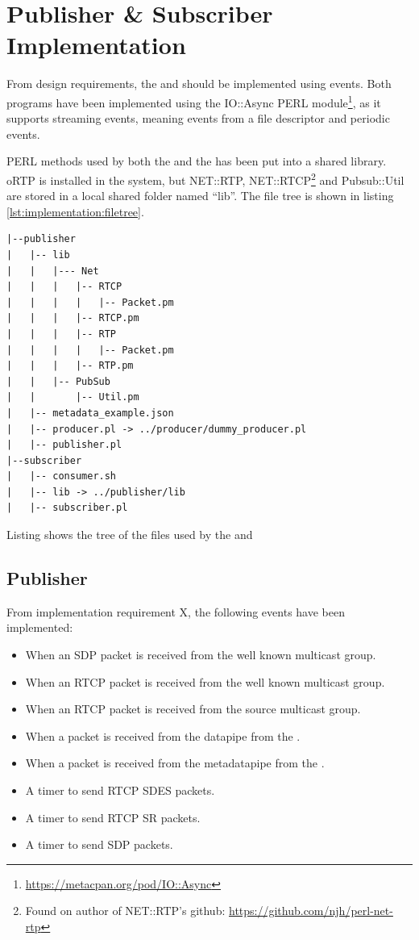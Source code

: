 \section{Publisher \& Subscriber Implementation} \label{sec:implementation:implpubsub}
From design requirements, the \pub{} and \sub{} should be implemented using events. Both programs have been implemented using the IO::Async PERL module\footnote{\url{https://metacpan.org/pod/IO::Async}}, as it supports streaming events, meaning events from a file descriptor and periodic events.

\noindent{}PERL methods used by both the \sub{} and the \pub{} has been put into a shared library. oRTP is installed in the system, but  NET::RTP, NET::RTCP\footnote{Found on author of NET::RTP's github: \url{https://github.com/njh/perl-net-rtp}} and Pubsub::Util are stored in a local shared folder named ``lib''. The file tree is shown in listing \ref{lst:implementation:filetree}.

\begin{listing}[H] 
	\begin{verbatim}
|--publisher
|   |-- lib
|   |   |--- Net
|   |   |   |-- RTCP
|   |   |   |   |-- Packet.pm
|   |   |   |-- RTCP.pm
|   |   |   |-- RTP
|   |   |   |   |-- Packet.pm
|   |   |   |-- RTP.pm
|   |   |-- PubSub
|   |       |-- Util.pm
|   |-- metadata_example.json
|   |-- producer.pl -> ../producer/dummy_producer.pl
|   |-- publisher.pl
|--subscriber
|   |-- consumer.sh
|   |-- lib -> ../publisher/lib
|   |-- subscriber.pl
\end{verbatim}
\caption{Listing shows the tree of the files used by the \sub{} and \pub{}}
\label{lst:implementation:filetree}
\end{listing}

\subsection{Publisher}
From implementation requirement X, the following events have been implemented:
\begin{itemize}
	\item When an SDP packet is received from the well known multicast group.
	\item When an RTCP packet is received from the well known multicast group.
	\item When an RTCP packet is received from the source multicast group.
	\item When a packet is received from the datapipe from the \pro{}.
	\item When a packet is received from the metadatapipe from the \pro{}.
	\item A timer to send RTCP SDES packets.
	\item A timer to send RTCP SR packets.
	\item A timer to send SDP packets.
\end{itemize}

